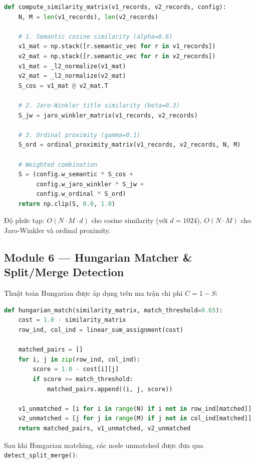 \begin{lstlisting}[language=Python, caption={Xây dựng ma trận tương đồng đa trọng số}, label={lst:sim_matrix}]
def compute_similarity_matrix(v1_records, v2_records, config):
    N, M = len(v1_records), len(v2_records)

    # 1. Semantic cosine similarity (alpha=0.6)
    v1_mat = np.stack([r.semantic_vec for r in v1_records])
    v2_mat = np.stack([r.semantic_vec for r in v2_records])
    v1_mat = _l2_normalize(v1_mat)
    v2_mat = _l2_normalize(v2_mat)
    S_cos = v1_mat @ v2_mat.T

    # 2. Jaro-Winkler title similarity (beta=0.3)
    S_jw = jaro_winkler_matrix(v1_records, v2_records)

    # 3. Ordinal proximity (gamma=0.1)
    S_ord = ordinal_proximity_matrix(v1_records, v2_records, N, M)

    # Weighted combination
    S = (config.w_semantic * S_cos +
         config.w_jaro_winkler * S_jw +
         config.w_ordinal * S_ord)
    return np.clip(S, 0.0, 1.0)
\end{lstlisting}

Độ phức tạp: $O(N \cdot M \cdot d)$ cho cosine similarity (với $d=1024$), $O(N \cdot M)$ cho Jaro-Winkler và ordinal proximity.

\subsection{Module 6 — Hungarian Matcher \& Split/Merge Detection}

Thuật toán Hungarian được áp dụng trên ma trận chi phí $C = 1 - S$:

\begin{lstlisting}[language=Python, caption={Hungarian matching với split/merge detection}, label={lst:hungarian}]
def hungarian_match(similarity_matrix, match_threshold=0.65):
    cost = 1.0 - similarity_matrix
    row_ind, col_ind = linear_sum_assignment(cost)

    matched_pairs = []
    for i, j in zip(row_ind, col_ind):
        score = 1.0 - cost[i][j]
        if score >= match_threshold:
            matched_pairs.append((i, j, score))

    v1_unmatched = [i for i in range(N) if i not in row_ind[matched]]
    v2_unmatched = [j for j in range(M) if j not in col_ind[matched]]
    return matched_pairs, v1_unmatched, v2_unmatched
\end{lstlisting}

Sau khi Hungarian matching, các node unmatched được đưa qua \texttt{detect\_split\_merge()}:

